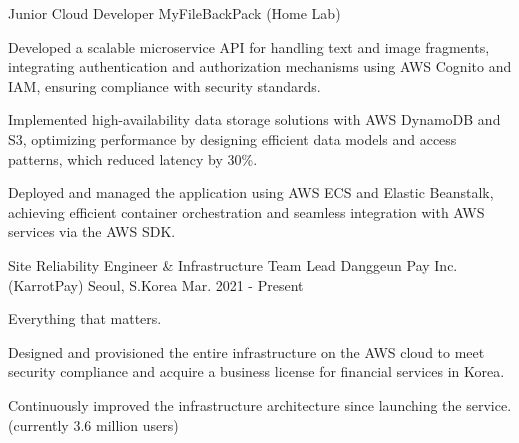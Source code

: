 

\begin{cventries}

\cventry
{Junior Cloud Developer} %
{MyFileBackPack (Home Lab)} %
{} %
{} %
{
  \begin{cvitems} %
    \item {Developed a scalable microservice API for handling text and image fragments, integrating authentication and authorization mechanisms using AWS Cognito and IAM, ensuring compliance with security standards.}
    \item {Implemented high-availability data storage solutions with AWS DynamoDB and S3, optimizing performance by designing efficient data models and access patterns, which reduced latency by 30\%.}
    \item {Deployed and managed the application using AWS ECS and Elastic Beanstalk, achieving efficient container orchestration and seamless integration with AWS services via the AWS SDK.}
  \end{cvitems}
}

\cventry
{Site Reliability Engineer \& Infrastructure Team Lead} %
{Danggeun Pay Inc. (KarrotPay)} %
{Seoul, S.Korea} %
{Mar. 2021 - Present} %
{
  \begin{cvitems} %
    \item {Everything that matters.}
    \item {Designed and provisioned the entire infrastructure on the AWS cloud to meet security compliance and acquire a business license for financial services in Korea.}
    \item {Continuously improved the infrastructure architecture since launching the service. (currently 3.6 million users)}
  \end{cvitems}
}


\end{cventries}
